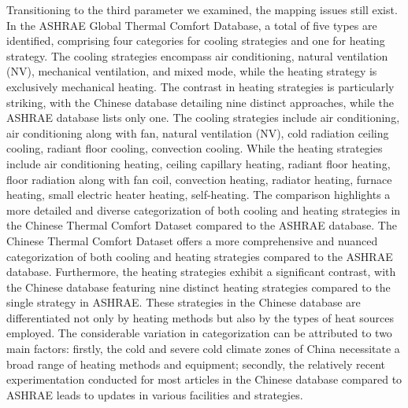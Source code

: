 \documentclass[final,3p,times,12pt]{elsarticle}
\begin{document}
Transitioning to the third parameter we examined, the mapping issues still exist. In the ASHRAE Global Thermal Comfort Database, a total of five types are identified, comprising four categories for cooling strategies and one for heating strategy. The cooling strategies encompass air conditioning, natural ventilation (NV), mechanical ventilation, and mixed mode, while the heating strategy is exclusively mechanical heating. 
The contrast in heating strategies is particularly striking, with the Chinese database detailing nine distinct approaches, while the ASHRAE database lists only one.
The cooling strategies include air conditioning, air conditioning along with fan, natural ventilation (NV), cold radiation ceiling cooling, radiant floor cooling, convection cooling. While the heating strategies include air conditioning heating, ceiling capillary heating, radiant floor heating, floor radiation along with fan coil, convection heating, radiator heating, furnace heating, small electric heater heating, self-heating. 
The comparison highlights a more detailed and diverse categorization of both cooling and heating strategies in the Chinese Thermal Comfort Dataset compared to the ASHRAE database. 
The Chinese Thermal Comfort Dataset offers a more comprehensive and nuanced categorization of both cooling and heating strategies compared to the ASHRAE database.
Furthermore, the heating strategies exhibit a significant contrast, with the Chinese database featuring nine distinct heating strategies compared to the single strategy in ASHRAE. These strategies in the Chinese database are differentiated not only by heating methods but also by the types of heat sources employed. The considerable variation in categorization can be attributed to two main factors: firstly, the cold and severe cold climate zones of China necessitate a broad range of heating methods and equipment; secondly, the relatively recent experimentation conducted for most articles in the Chinese database compared to ASHRAE leads to updates in various facilities and strategies.
\end{document}
